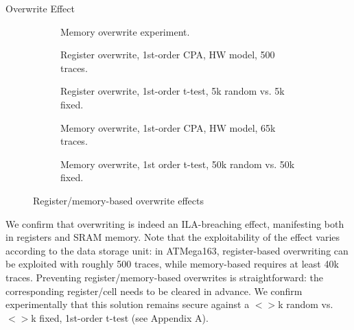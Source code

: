 \begin{subsection}{Overwrite Effect}
\begin{figure}[H]
\begin{subfigure}[b]{0.4\textwidth}
        \caption{\scriptsize{Memory overwrite experiment.}}

    \end{subfigure}

 \begin{subfigure}[b]{0.47\textwidth}

        \caption{\scriptsize{Register overwrite, 1st-order CPA, HW model, 500 traces.}}

    \end{subfigure}
 \begin{subfigure}[b]{0.47\textwidth}

        \caption{\scriptsize{Register overwrite, 1st-order t-test, 5k random vs. 5k fixed.}}

    \end{subfigure}

    \begin{subfigure}[b]{0.47\textwidth}
        \caption{\scriptsize{Memory overwrite, 1st-order CPA, HW model, 65k traces.}}
        \label{fig:tiger}
    \end{subfigure}
    \begin{subfigure}[b]{0.47\textwidth}
        \caption{\scriptsize{Memory overwrite, 1st order t-test, 50k random vs. 50k fixed.}}

    \end{subfigure}
    \caption{Register/memory-based overwrite effects}\label{fig:mem}
\end{figure}
We confirm that overwriting is indeed an ILA-breaching effect, manifesting both in registers and SRAM memory. Note that the exploitability of the effect varies according to the data storage unit: in ATMega163, register-based overwriting can be exploited with roughly 500 traces, while memory-based requires at least 40k traces. Preventing register/memory-based overwrites is straightforward: the corresponding register/cell needs to be cleared in advance. We confirm experimentally that this solution remains secure against a $<>$k  random vs. $<>$k fixed, 1st-order t-test (see Appendix A).
\label{overwrite_section}
\end{subsection}

